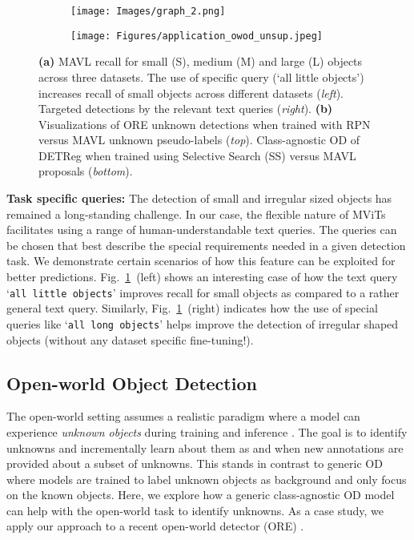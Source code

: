 \documentclass[runningheads]{llncs}
\newcommand{\txt}[1]{{\texttt{#1}}}
\begin{document}
\begin{figure}[t]
  \centering
  \begin{subfigure}{.495\textwidth}
    \centering
    \texttt{[image: Images/graph\_2.png]}
    \caption{}
    \label{fig:graph_2}
  \end{subfigure}\hfill
  \begin{subfigure}{.495\textwidth}
    \centering
    \texttt{[image: Figures/application\_owod\_unsup.jpeg]}
    \caption{}
    \label{fig:ore_detreg}
  \end{subfigure}\caption{\textbf{\color{blue}(a)} \small MAVL recall for small (S), medium (M) and large (L) objects across three datasets. The use of specific query (‘all little objects’) increases recall of small objects across different datasets (\emph{left}). Targeted detections by the relevant text queries (\emph{right}). \textbf{\color{blue}(b)} \small Visualizations of ORE \cite{joseph2021towards} unknown detections when trained with RPN versus MAVL  unknown pseudo-labels (\emph{top}). Class-agnostic OD of DETReg \cite{detreg} when trained using Selective Search (SS) \cite{uijlings2013selective} 
 versus MAVL proposals (\emph{bottom}).}
\label{fig:4-5_comb}
\end{figure}

\noindent \textbf{Task specific queries:} 
The detection of small and irregular sized objects has remained a long-standing challenge. 
In our case, the flexible nature of MViTs facilitates using a range of human-understandable text queries. The queries can be chosen that best describe the special requirements needed in a given detection task. We demonstrate certain scenarios of how this feature can be exploited for better predictions. Fig.~\ref{fig:graph_2}~(left) shows an interesting case of how the text query ‘\txt{all little objects}’ improves recall for small objects as compared to a rather general text query. Similarly, Fig.~\ref{fig:graph_2}~(right) indicates how the use of special queries like ‘\txt{all long objects}’ helps improve the detection of irregular shaped objects (without any dataset specific fine-tuning!). 

\subsection{Open-world Object Detection}
The open-world setting assumes a realistic paradigm where a model can experience \emph{unknown objects} during training and inference \cite{bendale2015towards,dhamija2020overlooked,wang2021unidentified,joseph2021towards}. The goal is to identify unknowns and incrementally learn about them as and when new annotations are provided about a subset of unknowns. This stands in contrast to generic OD where models are trained to label unknown objects as background and only focus on the known objects. Here, we explore how a generic class-agnostic OD model can help with the open-world task to identify unknowns. As a case study, we apply our approach to a recent open-world detector (ORE) \cite{joseph2021towards}.
\end{document}
